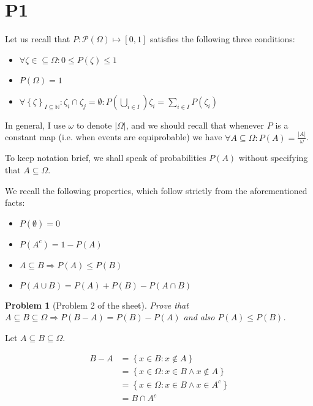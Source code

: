 \documentclass[a4paper, 12pt]{article}
\newtheorem{problem}{Problem}
\newtheorem{problem}{Problem}
\begin{document}
   
\section{P1}

Let us recall that $P : \mathcal{P}(\Omega) \mapsto [0, 1]$ satisfies the following three 
conditions:

\begin{itemize}
    \item $\forall \zeta \in \subseteq \Omega : 0 \leq P(\zeta) \leq 1$
    \item $P(\Omega) = 1$
    \item $\forall \left\{ \zeta \right\}_{I \subseteq \mathbb{N}} : \zeta_i \cap  \zeta_j = \emptyset : P(\bigcup_{i \in I}) \zeta_i = \sum_{i \in I} P(\zeta_i) $
\end{itemize}

In general, I use $\omega$ to denote $|\Omega|$, and we should recall that whenever $P$ is a constant 
map (i.e. when events are equiprobable) we have $\forall A \subseteq \Omega : P(A) = \frac{|A|}{\omega}$.

To keep notation brief, we shall speak of probabilities $P(A)$ without specifying that 
$A \subseteq \Omega$.

We recall the following properties, which follow strictly from the aforementioned 
facts:

\begin{itemize}
    \item $P(\emptyset) = 0$
    \item $P(A^c) = 1 - P(A)$
    \item $A \subseteq B \Rightarrow P(A) \leq P(B)$
    \item $P(A \cup B) = P(A) + P(B) - P(A \cap B)$
\end{itemize}

\pagebreak

\begin{problem}[Problem 2 of the sheet]
    Prove that $A \subseteq B \subseteq \Omega \Rightarrow P(B- A) = P(B) - P(A)$ and also
    $P(A) \leq P(B)$.
\end{problem}

Let $A \subseteq B \subseteq \Omega$.

\begin{align*}
    B - A &= \left\{ x \in B : x \not\in A \right\}  \\ 
    &=\left\{ x \in \Omega : x \in B \land  x\not\in A \right\} \\
    &= \left\{ x \in \Omega : x \in B \land x \in A^c \right\}  \\ 
    &= B \cap A^c
\end{align*}
\end{document}
